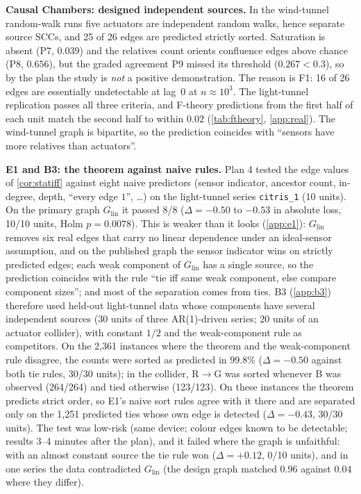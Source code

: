 \textbf{Causal Chambers: designed independent sources.} In the wind-tunnel
random-walk runs \citep{gamella2025chambers} five actuators are independent
random walks, hence separate source SCCs, and 25 of 26 edges are predicted
strictly sorted. Saturation is absent (P7, $0.039$) and the relatives count
orients confluence edges above chance (P8, $0.656$), but the graded agreement
P9 missed its threshold ($0.267<0.3$), so by the plan the study is \emph{not}
a positive demonstration. The reason is F1: 16 of 26 edges are essentially
undetectable at lag~0 at $n\approx10^3$. The light-tunnel replication passes
all three criteria, and F-theory predictions from the first half of each unit
match the second half to within $0.02$ (\cref{tab:ftheory}, \cref{app:real}).
The wind-tunnel graph is bipartite, so the prediction coincides with
``sensors have more relatives than actuators''.

\textbf{E1 and B3: the theorem against naive rules.} Plan 4 tested the edge
values of \cref{cor:statiff} against eight naive predictors (sensor
indicator, ancestor count, in-degree, depth, ``every edge $1$'', \dots) on the
light-tunnel series \texttt{citris\_1} (10 units). On the primary graph
$G_{\mathrm{lin}}$ it passed 8/8 ($\Delta=-0.50$ to $-0.53$ in absolute loss,
10/10 units, Holm $p=0.0078$). This is weaker than it looks
(\cref{app:e1}): $G_{\mathrm{lin}}$ removes six real edges that carry no linear
dependence under an ideal-sensor assumption, and on the published graph the
sensor indicator wins on strictly predicted edges; each weak component of
$G_{\mathrm{lin}}$ has a single source, so the prediction coincides with the
rule ``tie iff same weak component, else compare component sizes''; and most
of the separation comes from ties. B3 (\cref{app:b3}) therefore used held-out
light-tunnel data whose components have several independent sources (30
units of three AR(1)-driven series; 20 units of an actuator collider), with
constant $1/2$ and the weak-component rule as competitors. On the 2{,}361
instances where the theorem and the weak-component rule disagree, the counts
were sorted as predicted in $99.8\%$ ($\Delta=-0.50$ against both tie rules,
30/30 units); in the collider, R$\to$G was sorted whenever B was observed
(264/264) and tied otherwise (123/123). On these instances the theorem
predicts strict order, so E1's naive sort rules agree with it there and are
separated only on the 1{,}251 predicted ties whose own edge is detected
($\Delta=-0.43$, 30/30 units). The test was low-risk (same device; colour edges
known to be detectable; results 3--4 minutes after the plan), and it failed
where the graph is unfaithful: with an almost constant source the tie rule won
($\Delta=+0.12$, 0/10 units), and in one series the data contradicted
$G_{\mathrm{lin}}$ (the design graph matched $0.96$ against $0.04$ where they
differ).

